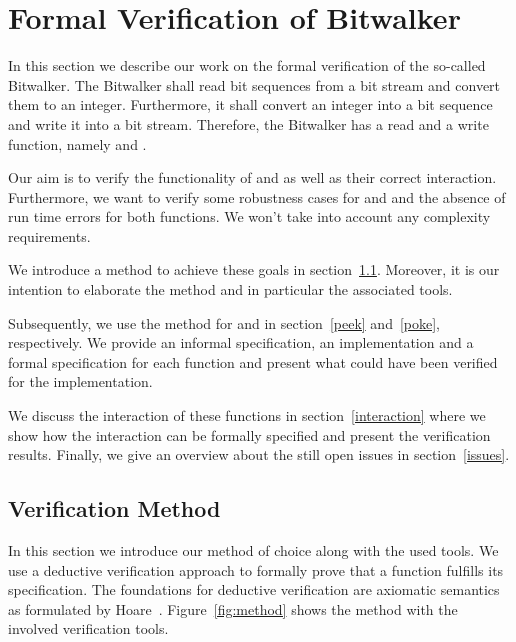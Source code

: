 
\section{Formal Verification of Bitwalker}


In this section we describe our work on the formal verification
of the so-called Bitwalker.
The Bitwalker shall read bit sequences from a bit stream 
and convert them to an integer. Furthermore, it shall
convert an integer into a bit sequence and write it into a bit stream.
Therefore, the Bitwalker has a read and a write function, namely \peek and \poke.

Our aim is to verify the functionality of
\peek and \poke
as well as their correct interaction.
Furthermore, we want to verify some robustness cases for \peek and \poke
and the absence of run time errors for both functions.
We won't take into account any complexity requirements.

We introduce a method to achieve these goals in section~\ref{plan}.
Moreover, it is our intention
to elaborate the method and in particular the associated tools.

Subsequently, we use the method for \peek and \poke
in section~\ref{peek} and~\ref{poke}, respectively.
We provide an informal specification, an implementation and
a formal specification for each function and
present what could have been verified for the implementation.

We discuss the interaction of these functions in section~\ref{interaction}
where we show how the interaction can be formally specified 
and present the verification results.
Finally, we give an overview about the still open issues in section~\ref{issues}.


\subsection{Verification Method}
\label{plan}
\label{method}

In this section we introduce our method of choice along with the used tools.
We use a deductive verification approach to 
formally prove that a function fulfills its specification.
The foundations for deductive verification are axiomatic semantics as formulated
by Hoare~\cite{HoareCalculus}.
Figure~\ref{fig:method} shows the method with the involved verification tools.

